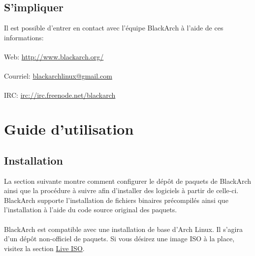 \documentclass[a4paper, oneside, 11pt]{book}
\begin{document}


\section{S'impliquer}
Il est possible d'entrer en contact avec l'équipe BlackArch à l'aide de ces
informations:
\\\\
Web: \url{http://www.blackarch.org/}
\\\\
Courriel: \href{mailto:blackarchlinux@gmail.com}{blackarchlinux@gmail.com}
\\\\
IRC: \url{irc://irc.freenode.net/blackarch}


\chapter{Guide d'utilisation}

\section{Installation}
La section suivante montre comment configurer le dépôt de paquets de BlackArch ainsi
que la procédure à suivre afin d'installer des logiciels à partir de
celle-ci. BlackArch supporte l'installation de fichiers binaires précompilés
ainsi que l'installation à l'aide du code source original des paquets.
\\\\
BlackArch est compatible avec une installation de base d'Arch Linux. Il s'agira
d'un dépôt non-officiel de paquets. Si vous désirez une image ISO à la place,
visitez la section \href{http://www.blackarch.org/download.html#iso}{Live ISO}.
\\\\
\end{document}
